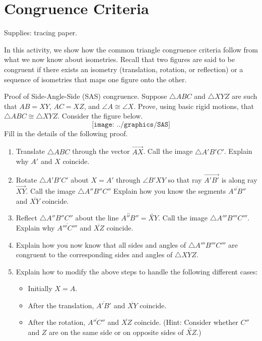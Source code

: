 \newpage

\section{Congruence Criteria}
\begin{teachingnote}
Supplies: tracing paper.
\end{teachingnote}
In this activity, we show how the common triangle congruence criteria follow from
 what we now know about isometries.  Recall that two figures are said to be 
congruent if there exists an isometry (translation, rotation, or reflection) or a 
sequence of isometries that maps one figure onto the other.  

\begin{prob}
Proof of Side-Angle-Side (SAS) congruence.  Suppose $\triangle ABC$ and $\triangle XYZ$ are such that $AB=XY$, $AC=XZ$, and $\angle A \cong \angle X$.  Prove, using basic rigid motions, that $\triangle ABC \cong \triangle XYZ$.  Consider the figure below.  
$$\texttt{[image: ../graphics/SAS]}$$
Fill in the details of the following proof.  
\begin{enumerate}
\item Translate $\triangle ABC$ through the vector $\overrightarrow{AX}$.  Call the image $\triangle A'B'C'$.  Explain why $A'$ and $X$ coincide.
\item Rotate $\triangle A'B'C'$ about $X=A'$ through $\angle B'XY$ so that ray $\overrightarrow{A'B'}$ is along ray $\overrightarrow{XY}$.  Call the image $\triangle A''B''C''$   Explain how you know the segments $\overline{A''B''}$ and $\overline{XY}$ coincide. 
\item Reflect $\triangle A''B''C''$ about the line $\overleftrightarrow{A''B''} = \overleftrightarrow{XY}$.  Call the image $\triangle A'''B'''C'''$.  Explain why $\overline{A'''C'''}$ and $\overline{XZ}$ coincide.
\item Explain how you now know that all sides and angles of $\triangle A'''B'''C'''$ are congruent to the corresponding sides and angles of $\triangle XYZ$.  
\item Explain how to modify the above steps to handle the following different cases: 
\begin{itemize}
\item Initially $X = A$. 
\item After the translation, $\overline{A'B'}$ and $\overline{XY}$ coincide. 
\item After the rotation, $\overline{A''C''}$ and $\overline{XZ}$ coincide.  (Hint:  Consider whether $C''$ and $Z$ are on the same side or on opposite sides of $\overleftrightarrow{XZ}$.)  
\end{itemize}
\end{enumerate}
\end{prob}

